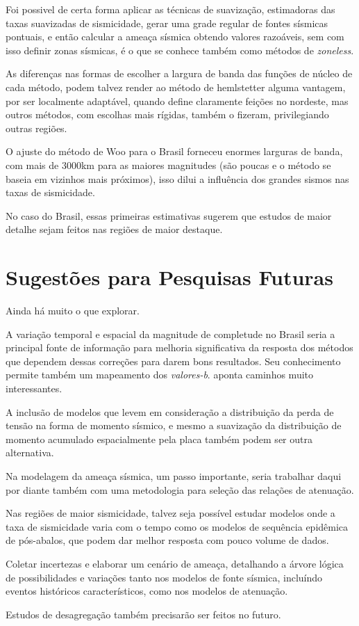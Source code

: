 Foi possivel de certa forma aplicar as técnicas de suavização, estimadoras das taxas suavizadas de sismicidade, 
gerar uma grade regular de fontes sísmicas pontuais, e então calcular a ameaça sísmica obtendo 
valores razoáveis, sem com isso definir zonas sísmicas, é o que se conhece também como métodos de \emph{zoneless}.

As diferenças nas formas de escolher a largura de banda das funções de núcleo de cada método,
podem talvez render ao método de hemlstetter alguma vantagem, por ser localmente adaptável,
quando define claramente feições no nordeste, mas outros métodos, com escolhas mais rígidas,
também o fizeram, privilegiando outras regiões.

O ajuste do método de Woo para o Brasil forneceu enormes larguras de banda, com mais de 3000km para
as maiores magnitudes (são poucas e o método se baseia em vizinhos mais próximos), isso dilui
a influência dos grandes sismos nas taxas de sismicidade.

No caso do Brasil, essas primeiras estimativas sugerem que estudos de maior detalhe 
sejam feitos nas regiões de maior destaque.



\section{Sugestões para Pesquisas Futuras} 

Ainda há muito o que explorar.

A variação temporal e espacial da magnitude de completude no Brasil seria a principal fonte de informação 
para melhoria significativa da resposta dos métodos que dependem dessas correções para darem bons resultados.
Seu conhecimento permite também um mapeamento dos \emph{valores-b}. \citet{vorobieva_2013} aponta caminhos muito
interessantes.

A inclusão de modelos que levem em consideração a distribuição da perda de tensão na forma de momento sísmico,
e mesmo a suavização da distribuição de momento acumulado espacialmente pela placa também podem ser outra alternativa.

Na modelagem da ameaça sísmica, um passo importante, seria trabalhar daqui por diante também com uma metodologia
para seleção das relações de atenuação.

Nas regiões de maior sismicidade, talvez seja possível estudar modelos onde a taxa de sismicidade varia com o tempo
como os modelos de sequência epidêmica de pós-abalos, que podem dar melhor resposta com pouco volume de dados.

Coletar incertezas e elaborar um cenário de ameaça,
detalhando a árvore lógica de possibilidades e variações
tanto nos modelos de fonte sísmica, incluíndo eventos históricos característicos, 
como nos modelos de atenuação. 

Estudos de desagregação \citep{pagani_2007} também precisarão ser feitos no futuro.

